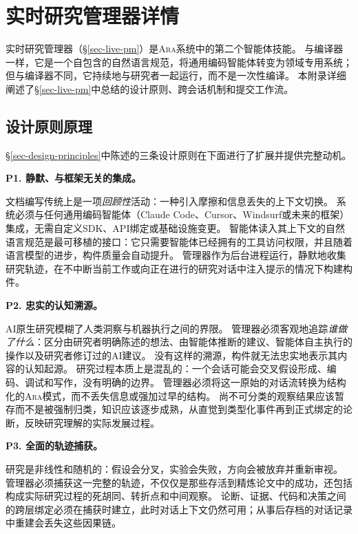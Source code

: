 \documentclass[
]{article}
\theoremstyle{definition}
\newcommand{\ara}{\textsc{Ara}}
\begin{document}
\section{实时研究管理器详情}\label{sec-app-lrm-details}

实时研究管理器（\S\ref{sec-live-pm}）是\ara{}系统中的第二个智能体技能。
与编译器一样，它是一个自包含的自然语言规范，将通用编码智能体转变为领域专用系统；但与编译器不同，它持续地与研究者一起运行，而不是一次性编译。
本附录详细阐述了\S\ref{sec-live-pm}中总结的设计原则、跨会话机制和提交工作流。

\subsection{设计原则原理}\label{sec-app-lrm-principles}

\S\ref{sec-design-principles}中陈述的三条设计原则在下面进行了扩展并提供完整动机。

\textbf{P1. 静默、与框架无关的集成。}

文档编写传统上是一项\emph{回顾性}活动：一种引入摩擦和信息丢失的上下文切换。
系统必须与任何通用编码智能体（Claude
Code、Cursor、Windsurf或未来的框架）集成，无需自定义SDK、API绑定或基础设施变更。
智能体读入其上下文的自然语言规范是最可移植的接口：它只需要智能体已经拥有的工具访问权限，并且随着语言模型的进步，构件质量会自动提升。
管理器作为后台进程运行，静默地收集研究轨迹，在不中断当前工作或向正在进行的研究对话中注入提示的情况下构建构件。

\textbf{P2. 忠实的认知溯源。}

AI原生研究模糊了人类洞察与机器执行之间的界限。
管理器必须客观地追踪\emph{谁做了什么}：区分由研究者明确陈述的想法、由智能体推断的建议、智能体自主执行的操作以及研究者修订过的AI建议。
没有这样的溯源，构件就无法忠实地表示其内容的认知起源。
研究过程本质上是混乱的：一个会话可能会交叉假设形成、编码、调试和写作，没有明确的边界。
管理器必须将这一原始的对话流转换为结构化的\ara{}模式，而不丢失信息或强加过早的结构。
尚不可分类的观察结果应该暂存而不是被强制归类，知识应该逐步成熟，从直觉到类型化事件再到正式绑定的论断，反映研究理解的实际发展过程。

\textbf{P3. 全面的轨迹捕获。}

研究是非线性和随机的：假设会分叉，实验会失败，方向会被放弃并重新审视。
管理器必须捕获这一完整的轨迹，不仅仅是那些存活到精炼论文中的成功，还包括构成实际研究过程的死胡同、转折点和中间观察。
论断、证据、代码和决策之间的跨层绑定必须在捕获时建立，此时对话上下文仍然可用；从事后存档的对话记录中重建会丢失这些因果链。
\end{document}
